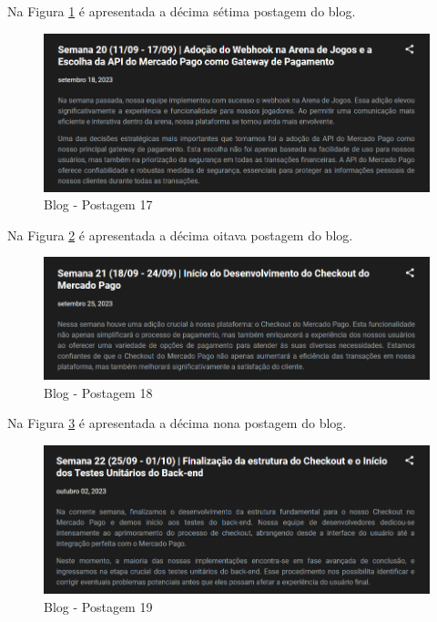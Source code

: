 \begin{apendicesenv}
Na Figura \ref{fig:125} é apresentada a décima sétima postagem do blog.

\begin{figure}[H]
	\centering
	\includegraphics[scale=0.68]{./imagens/Blog17.png}
	\caption{Blog - Postagem 17}
    \label{fig:125}
\end{figure}

Na Figura \ref{fig:126} é apresentada a décima oitava postagem do blog.

\begin{figure}[H]
	\centering
	\includegraphics[scale=0.68]{./imagens/Blog18.png}
	\caption{Blog - Postagem 18}
    \label{fig:126}
\end{figure}
\pagebreak

Na Figura \ref{fig:127} é apresentada a décima nona postagem do blog.

\begin{figure}[H]
	\centering
	\includegraphics[scale=0.68]{./imagens/Blog19.png}
	\caption{Blog - Postagem 19}
    \label{fig:127}
\end{figure}


\end{apendicesenv}

